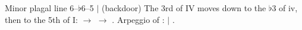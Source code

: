 \begin{patternbox}{Minor plagal line 6--$\flat$6--5}{  $|$  (backdoor)}
The 3rd of IV moves down to the $\flat$3 of iv, then to the 5th of I:
 $\to$  $\to$ . Arpeggio of :  $|$ .
\patternwhereline
\end{patternbox}
